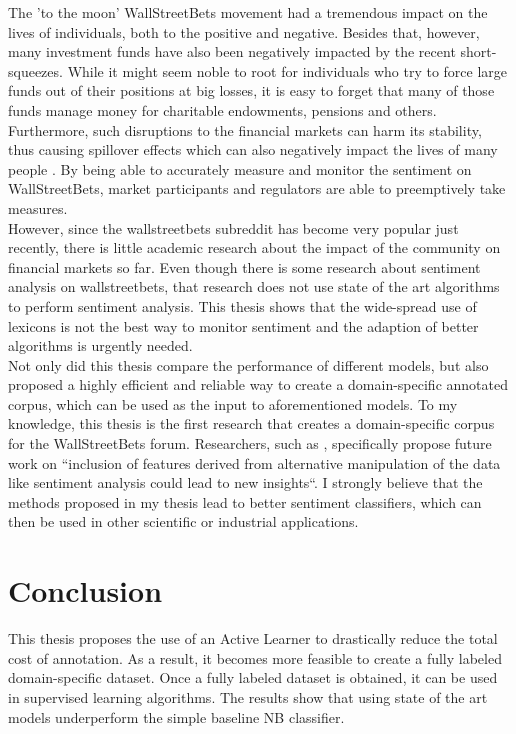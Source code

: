 \documentclass[11pt, a4paper]{article}
\begin{document}
The 'to the moon' WallStreetBets movement had a tremendous impact on the lives of individuals, both to the positive and negative. 
Besides that, however, many investment funds have also been negatively impacted by the recent short-squeezes. 
While it might seem noble to root for individuals who try to force large funds out of their positions at big losses, it is easy to forget that many 
of those funds manage money for charitable endowments, pensions and others. 
Furthermore, such disruptions to the financial markets can harm its stability, thus causing spillover effects which can also negatively impact the 
lives of many people \citep{lyocsa2021yolotrading}.
By being able to accurately measure and monitor the sentiment on WallStreetBets, market participants and regulators are able to preemptively take measures.\\
However, since the wallstreetbets subreddit has become very popular just recently, there is little academic research about the impact of the community on 
financial markets so far. Even though there is some research about sentiment analysis on wallstreetbets, that research does not use state of the art algorithms to perform 
sentiment analysis. This thesis shows that the wide-spread use of lexicons is not the best way to monitor sentiment and the adaption of better algorithms is urgently needed.\\
Not only did this thesis compare the performance of different models, but also proposed a highly efficient and reliable way to create a domain-specific annotated corpus, 
which can be used as the input to aforementioned models. To my knowledge, this thesis is the first research that creates a domain-specific corpus for the WallStreetBets forum. 
Researchers, such as \cite{talamas2021socialmediaeffectsonthemarket}, specifically propose future work on “inclusion of features derived from alternative manipulation of the data like sentiment analysis 
could lead to new insights“. I strongly believe that the methods proposed in my thesis lead to better sentiment classifiers, 
which can then be used in other scientific or industrial applications.



\section{Conclusion}
This thesis proposes the use of an Active Learner to drastically reduce the total cost of annotation. 
As a result, it becomes more feasible to create a fully labeled domain-specific dataset. 
Once a fully labeled dataset is obtained, it can be used in supervised learning algorithms. 
The results show that using state of the art models underperform the simple baseline NB classifier.



\end{document}
